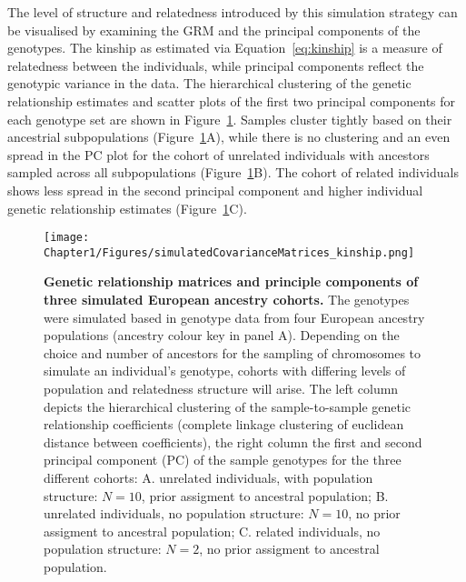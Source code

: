 The level of structure and relatedness introduced by this simulation strategy can be visualised by examining the GRM and the principal components of the genotypes. The kinship as estimated via Equation~\ref{eq:kinship} is a measure of relatedness between the individuals, while principal components reflect the genotypic variance in the data. The hierarchical clustering of the genetic relationship estimates and scatter plots of the first two principal components for each genotype set are shown in Figure~\ref{fig:kinship-matrices}. Samples cluster tightly based on their ancestrial subpopulations (Figure~\ref{fig:kinship-matrices}A), while there is no clustering and an even spread in the PC plot for the cohort of unrelated individuals with ancestors sampled across all subpopulations (Figure~\ref{fig:kinship-matrices}B). The cohort of related individuals shows less spread in the second principal component and higher individual genetic relationship  estimates (Figure~\ref{fig:kinship-matrices}C).


\begin{figure}[!h]
	\centering
	\texttt{[image: Chapter1/Figures/simulatedCovarianceMatrices\_kinship.png]}
	\caption[Genetic relationship matrices and principal components of three simulated European ancestry cohorts]{\textbf{Genetic relationship matrices and principle components of three simulated European ancestry cohorts.} The genotypes were simulated based in genotype data from four European ancestry populations (ancestry colour key in panel A). Depending on the choice and number of ancestors for the sampling of chromosomes to simulate an individual's genotype, cohorts with differing levels of population and relatedness structure will arise. The left column depicts the hierarchical clustering of the sample-to-sample  genetic relationship coefficients (complete linkage clustering of euclidean distance between coefficients), the right column the first and second principal component (PC) of the sample genotypes for the three different cohorts: A. unrelated individuals, with population structure: \(N=10\), prior assigment to ancestral population; B. unrelated individuals, no population structure: \(N=10\), no prior assigment to ancestral population; C. related individuals, no population structure: \(N=2\), no prior assigment to ancestral population.}
 	\label{fig:kinship-matrices}
\end{figure}


